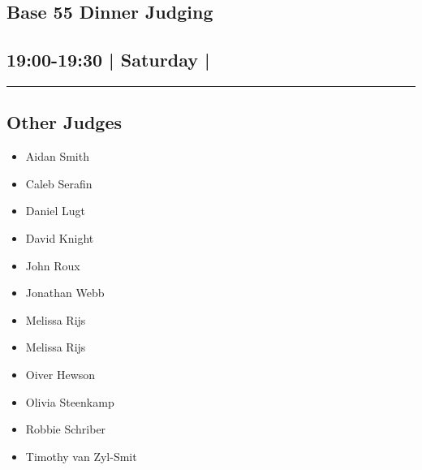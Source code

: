 \documentclass[10pt, A5]{article}
\begin{document}
	

		\begin{framed}
			\begin{minipage}{\textwidth}

			\setcounter{section}{70}
							\section{\faStar \: Base 55 \faStar \: Dinner Judging}
						
			\subsection*{19:00-19:30 | Saturday | }

			\vspace{0.25cm}
			\hrule
			\vspace{0.25cm}


			\subsection*{Other Judges}
							

				\begin{multicols}{2}

			\begin{itemize}
											\item Aidan Smith
											\item Caleb Serafin
											\item Daniel Lugt
											\item David Knight
											\item John Roux
											\item Jonathan Webb
											\item Melissa Rijs
								\end{itemize}

			\vfill\null
			\columnbreak

			\begin{itemize}
											\item Melissa Rijs
											\item Oiver Hewson
											\item Olivia Steenkamp
											\item Robbie Schriber
											\item Timothy van Zyl-Smit
								\end{itemize}

			\vfill\null

			\end{multicols}


\end{minipage}
\end{framed}
\end{document}
